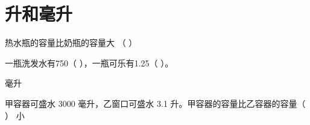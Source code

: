 
\section{升和毫升}


\xiaoti 热水瓶的容量比奶瓶的容量大          （    ）


\xiaoti 一瓶洗发水有750（   ），一瓶可乐有1.25（   ）。

  {毫升}

\xiaoti 甲容器可盛水 3000 毫升，乙窗口可盛水 3.1 升。甲容器的容量比乙容器的容量（   ）
  {小}
